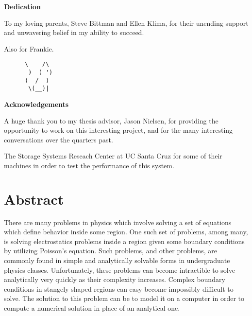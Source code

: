 \documentclass[12pt]{article}
\begin{document}
\begin{addmargin}[8em]{8em}
\begin{center}

	\textbf{Dedication}
	\vspace{50mm}

	To my loving parents, Steve Bittman and Ellen Klima, for their unending support
	and unwavering belief in my ability to succeed.

	\vspace{100mm}
	Also for Frankie.
\end{center}

\begin{addmargin}[6.2em]{8em}
\begin{verbatim}
      \    /\
       )  ( ')
      (  /  )
       \(__)|
\end{verbatim}
\end{addmargin}
\end{addmargin}
\clearpage
\begin{center}
	\textbf{Acknowledgements}
	\vspace{50mm}

	A huge thank you to my thesis advisor, Jason Nielsen, for providing the opportunity
	to work on this interesting project, and for the many interesting conversations over
	the quarters past.

	\vspace{10mm}
	The Storage Systems Reseach Center at UC Santa Cruz for some of their machines in order
	to test the performance of this system.

\end{center}
\clearpage
\tableofcontents
\clearpage
\listoffigures
\listoftables
\clearpage
\renewcommand{\lstlistlistingname}{List of Source Code Listings}
\lstlistoflistings
\clearpage

\renewcommand{\thepage}{\arabic{page}}
\setcounter{page}{1}
\section*{Abstract}

\onehalfspacing

There are many problems in physics which involve solving a set of equations which define behavior
inside some region. One such set of problems, among many, is solving electrostatics problems inside
a region given some boundary conditions by utilizing Poisson's equation. Such problems, and other
problems, are commonly found in simple and analytically solvable forms in undergraduate physics classes.
Unfortunately, these problems can become intractible to solve analytically very quickly as their complexity
increases. Complex boundary conditions in stangely shaped regions can easy become impossibly difficult to
solve. The solution to this problem can be to model it on a computer in order to compute a numerical solution
in place of an analytical one.
\end{document}
